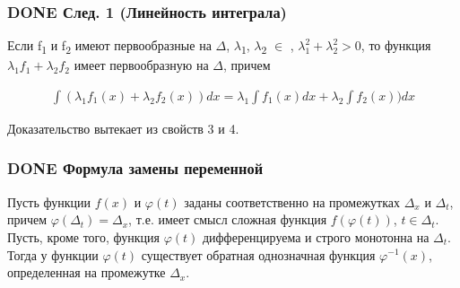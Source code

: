 \documentclass[11pt]{article}
\begin{document}
\subsubsection{{\bfseries\sffamily DONE} След. 1 (Линейность интеграла)}
\label{sec:org2fcd463}
Если f\textsubscript{1} и f\textsubscript{2} имеют первообразные на \(\Delta\), \(\lambda\)\textsubscript{1}, \(\lambda\)\textsubscript{2} \(\in\) \R, \(\lambda_1^2+\lambda_2^2>0\), 
то функция \(\lambda_1 f_1+\lambda_2 f_2\) имеет первообразную на \(\Delta\), причем

\begin{eqnarray}
\int(\lambda_1 f_1(x)+\lambda_2 f_2(x))dx=\lambda_1\int f_1(x)dx+\lambda_2\int f_2(x))dx
\end{eqnarray}

Доказательство вытекает из свойств 3 и 4.
\subsubsection{{\bfseries\sffamily DONE} Формула замены переменной}
\label{sec:org5bad8f8}
Пусть функции \(f(x)\) и \(\varphi(t)\) заданы соответственно на промежутках \(\Delta_x\) и \(\Delta_t\), 
причем \(\varphi (\Delta_t) = \Delta_x\), т.е. имеет смысл сложная функция \(f(\varphi(t))\), \(t \in \Delta_t\). 
Пусть, кроме того, функция \(\varphi(t)\) дифференцируема и строго монотонна на \(\Delta_t\). Тогда у функции \(\varphi(t)\)
существует обратная однозначная функция \(\varphi^{-1}(x)\), определенная на промежутке \(\Delta_x\).
\end{document}
